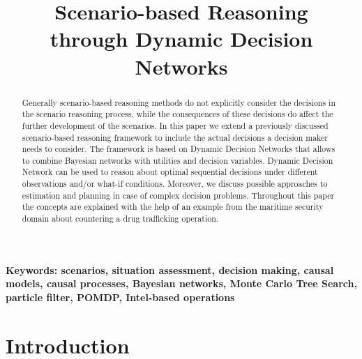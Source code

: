 \documentclass[conference]{IEEEtran}
\begin{document}
\title{Scenario-based Reasoning \\through Dynamic Decision Networks}

\author{
\and
{}
\and
{}
}


\maketitle

\begin{abstract}
Generally scenario-based reasoning methods do not explicitly consider the decisions in the scenario reasoning process, while the consequences of these decisions do affect the further development of the scenarios. In this paper we extend a previously discussed scenario-based reasoning framework to include the actual decisions a decision maker needs to consider. The framework is based on Dynamic Decision Networks that allows to combine Bayesian networks with utilities and decision variables. Dynamic Decision Network can be used to reason about optimal sequential decisions under different observations and/or what-if conditions. Moreover, we discuss possible approaches to estimation and planning in case of complex decision problems. Throughout this paper the concepts are explained with the help of an example from the maritime security domain about countering a drug trafficking operation.
\end{abstract}

\noindent
{\bf Keywords: scenarios, situation assessment, decision making, causal models, causal processes, Bayesian networks, Monte Carlo Tree Search, particle filter, POMDP, Intel-based operations}


\IEEEpeerreviewmaketitle

\section{Introduction}
\end{document}
